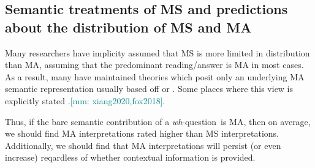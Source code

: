 \documentclass[12pt,letterpaper,table,svgnames,dvipsnames]{article}
\newcommand{\jd}[1]{\textcolor{Purple}{[jd: #1]}}
\newcommand{\mm}[1]{\textcolor{teal}{[mm: #1]}}
\newcommand{\whq}{\emph{wh}-question~}
\begin{document}



\subsection{Semantic treatments of MS and predictions about the distribution of MS and MA}


Many researchers have implicity assumed that MS is more limited in distribution than MA, assuming that the predominant reading/answer is MA in most cases. As a result, many have maintained theories which posit only an underlying MA semantic representation usually based off  or . Some places where this view is explicitly stated \cite[Ch.6]{groenstok1982,groenstok1984,karttunen1977,vanrooij2003,nicolae2014,fox2014,xiang2016,dayal2016,george2011}.\mm{xiang2020,fox2018}. 




Thus, if the bare semantic contribution of a \whq is MA, then on average, we should find MA interpretations rated higher than MS interpretations. Additionally, we should find that MA interpretations will persist (or even increase) reqardless of whether contextual information is provided.
\end{document}
